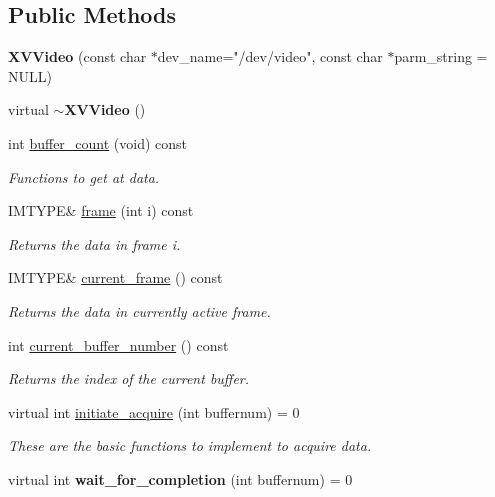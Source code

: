\subsection*{Public Methods}
\begin{CompactItemize}
\item 
\label{XVVideo_a0}
\hypertarget{class_XVVideo_a0}{
{\bf XVVideo} (const char $\ast$dev\_\-name="/dev/video", const char $\ast$parm\_\-string = NULL)}

\item 
\label{XVVideo_a1}
\hypertarget{class_XVVideo_a1}{
virtual {\bf $\sim$XVVideo} ()}

\item 
int \hyperlink{class_XVVideo_a2}{buffer\_\-count} (void) const
\begin{CompactList}\small\item\em Functions to get at data.\item\end{CompactList}\item 
IMTYPE\& \hyperlink{class_XVVideo_a3}{frame} (int i) const
\begin{CompactList}\small\item\em Returns the data in frame i.\item\end{CompactList}\item 
IMTYPE\& \hyperlink{class_XVVideo_a4}{current\_\-frame} () const
\begin{CompactList}\small\item\em Returns the data in currently active frame.\item\end{CompactList}\item 
int \hyperlink{class_XVVideo_a5}{current\_\-buffer\_\-number} () const
\begin{CompactList}\small\item\em Returns the index of the current buffer.\item\end{CompactList}\item 
virtual int \hyperlink{class_XVVideo_a6}{initiate\_\-acquire} (int buffernum) = 0
\begin{CompactList}\small\item\em These are the basic functions to implement to acquire data.\item\end{CompactList}\item 
\label{XVVideo_a7}
\hypertarget{class_XVVideo_a7}{
virtual int {\bf wait\_\-for\_\-completion} (int buffernum) = 0}


\end{CompactItemize}
